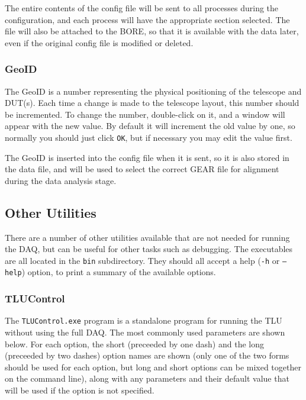 The entire contents of the config file will be sent to all processes during the configuration, and
each process will have the appropriate section selected.  The file will also be attached to the
\gls{BORE}, so that it is available with the data later, even if the original config file is
modified or deleted.

\subsubsection{GeoID}\label{sec:GeoID}
The GeoID is a number representing the physical positioning of the telescope and DUT(s).
Each time a change is made to the telescope layout, this number should be incremented.
To change the number, double-click on it, and a window will appear with the new value.
By default it will increment the old value by one, so normally you should just click \texttt{OK},
but if necessary you may edit the value first.

The GeoID is inserted into the config file when it is sent, so it is also stored in the data file,
and will be used to select the correct GEAR file for alignment during the data analysis stage.

\subsection{Other Utilities}
There are a number of other utilities available that are not needed for running the DAQ,
but can be useful for other tasks such as debugging.
The executables are all located in the \texttt{bin} subdirectory.
They should all accept a help (\texttt{-h} or \texttt{--help}) option,
to print a summary of the available options.

\subsubsection{TLUControl}
The \texttt{TLUControl.exe} program is a standalone program for running the TLU without using the
full DAQ. The most commonly used parameters are shown below. For each option, the short (preceeded
by one dash) and the long (preceeded by two dashes) option names are shown (only one of the two
forms should be used for each option, but long and short options can be mixed together on the
command line), along with any parameters and their default value that will be used if the option is
not specified.

